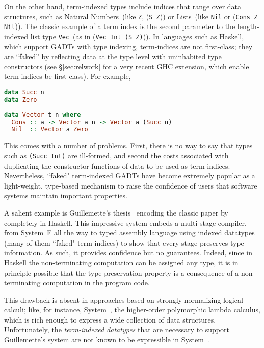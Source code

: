 On the other hand, term-indexed types include indices that range over data
structures, such as Natural Numbers~(like {\tt Z}, {(\tt S
Z})) or Lists~(like {\tt Nil} or ({\tt Cons Z Nil})). 
The classic example of a term index is the second
parameter to the length-indexed list type {\tt Vec}~(as in ({\tt Vec Int
(S Z)})).  In languages such as Haskell, which support GADTs with type indexing,
term-indices are not first-class;
they are ``faked'' by reflecting data at the type level with uninhabited
type constructors (see \S\ref{sec:relwork} for a very recent GHC extension,
	which enable term-indices be first class).
For example,\vspace*{-2pt}
\begin{lstlisting}[basicstyle={\ttfamily\small},language=Haskell,mathescape]
data Succ n
data Zero
\end{lstlisting}\vspace*{-8pt}
\begin{lstlisting}[basicstyle={\ttfamily\small},language=Haskell,mathescape]
data Vector t n where
  Cons :: a -> Vector a n -> Vector a (Succ n)
  Nil  :: Vector a Zero
\end{lstlisting}\vspace*{-2pt}
This comes with a number of problems. First, there is no way to say
that types such as {\tt (Succ Int)} are ill-formed, and second the costs
associated with duplicating the constructor functions of data to be used
as term-indices.
Nevertheless, ``faked" term-indexed GADTs have become extremely
popular as a light-weight, type-based mechanism
to raise the confidence of users that software systems maintain important
properties.  

A salient example is Guillemette's thesis~\cite{guillemetteThesis}
encoding the classic paper by~\citet{tal-toplas} completely
in Haskell. This impressive system embeds a multi-stage compiler, from
System~F all the way to typed assembly language using indexed datatypes
(many of them ``faked" term-indices) to
show that every stage preserves type information.
%
As such, it provides confidence but no guarantees.  Indeed, since in
Haskell the non-terminating computation can be assigned any type, it is in
principle possible that the type-preservation property is a consequence of
a non-terminating computation in the program code.

This drawback is absent in approaches based on strongly normalizing
logical calculi; like, for instance, System~\Fw, the higher-order
polymorphic lambda calculus, which is rich enough to express a wide
collection of data structures.  Unfortunately, the \emph{term-indexed
datatypes} that are necessary to support Guillemette's system are not
known to be expressible in System~\Fw.

